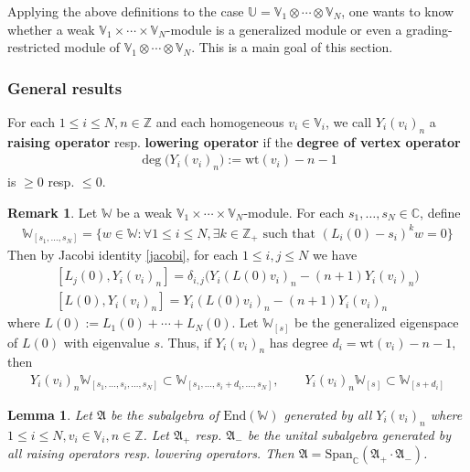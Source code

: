 \documentclass[11pt,b5paper,notitlepage]{article}
\theoremstyle{definition}
\newtheorem{rem}[df]{Remark}
\theoremstyle{plain}
\newtheorem{lm}[df]{Lemma}
\newcommand{\fk}{\mathfrak}
\newcommand{\End}{\mathrm{End}} %
\newcommand{\Span}{\mathrm{Span}}
\newcommand{\Vbb}{\mathbb V}
\newcommand{\Ubb}{\mathbb U}
\newcommand{\Wbb}{\mathbb W}
\newcommand{\Cbb}{\mathbb C}
\newcommand{\Zbb}{\mathbb Z}
\newcommand{\wt}{\mathrm{wt}}
\newcommand{\<}{\left\langle}
\renewcommand{\>}{\right\rangle}
\numberwithin{equation}{section}
\begin{document}
Applying the above definitions to the case $\Ubb=\Vbb_1\otimes\cdots\otimes\Vbb_N$, one wants to know whether a weak $\Vbb_1\times\cdots\times\Vbb_N$-module is a generalized module or even a grading-restricted module of $\Vbb_1\otimes\cdots\otimes\Vbb_N$. This is a main goal of this section. 



\subsubsection{General results}

For each $1\leq i\leq N,n\in\Zbb$ and each homogeneous $v_i\in\Vbb_i$, we call $Y_i(v_i)_n$ a \textbf{raising operator} resp. \textbf{lowering operator} if the \textbf{degree of vertex operator}
\begin{align}
\deg\big(Y_i(v_i)_n\big):= \wt(v_i)-n-1
\end{align}
is $\geq0$ resp. $\leq 0$. 

\begin{rem}
Let $\Wbb$ be a weak $\Vbb_1\times\cdots\times\Vbb_N$-module. For each $s_1,\dots,s_N\in\Cbb$, define \index{Wn@$\Wbb_{[n]},\Wbb_{[n_1,\dots,n_N]}$}
\begin{align}
\Wbb_{[s_1,\dots,s_N]}=\{w\in\Wbb:\forall 1\leq i\leq N, \exists k\in\Zbb_+\text{ such that }(L_i(0)-s_i)^kw=0\}
\end{align}
Then by Jacobi identity \eqref{jacobi}, for each $1\leq i,j\leq N$ we have
\begin{subequations}\label{eq157}
\begin{gather}
[L_j(0),Y_i(v_i)_n]=\delta_{i,j}(Y_i(L(0)v_i)_n-(n+1)Y_i(v_i)_n\big)  \label{eq140} \\
[L(0),Y_i(v_i)_n]=Y_i(L(0)v_i)_n-(n+1)Y_i(v_i)_n
\end{gather}
\end{subequations}
where $L(0):=L_1(0)+\cdots+L_N(0)$. Let $\Wbb_{[s]}$ be the generalized eigenspace of $L(0)$ with eigenvalue $s$. Thus, if $Y_i(v_i)_n$ has degree $d_i=\wt(v_i)-n-1$, then
\begin{gather}
Y_i(v_i)_n \Wbb_{[s_1,\dots,s_i,\dots,s_N]}\subset\Wbb_{[s_1,\dots,s_i+d_i,\dots,s_N]}, \qquad
Y_i(v_i)_n \Wbb_{[s]}\subset\Wbb_{[s+d_i]}  \label{eq112}
\end{gather}
\end{rem}



\begin{lm}\label{lb36}
Let $\fk A$ be the subalgebra of $\End(\Wbb)$ generated by all $Y_i(v_i)_n$ where $1\leq i\leq N,v_i\in\Vbb_i,n\in\Zbb$. Let $\fk A_+$ resp. $\fk A_-$ be the unital subalgebra generated by all raising operators resp. lowering operators. Then $\fk A=\Span_\Cbb(\fk A_+\cdot\fk A_-)$. 
\end{lm}
\end{document}
